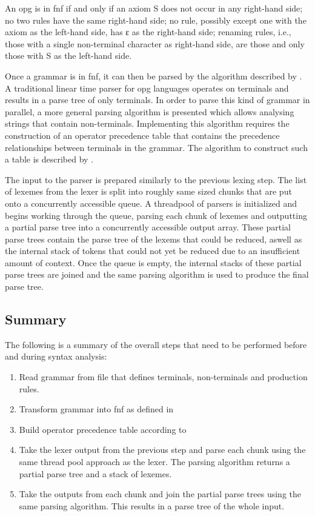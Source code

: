 An \gls{opg} is in \gls{fnf} if and only if an axiom S does not
occur in any right-hand side; no two rules have the same right-hand side;
no rule, possibly except one with the axiom as the left-hand side, has ε as
the right-hand side; renaming rules, i.e., those with a single non-terminal
character as right-hand side, are those and only those with S as the left-hand
side.

Once a grammar is in \gls{fnf}, it can then be parsed by the algorithm
described by \cite{barenghi_parallel_2015}. A traditional linear time parser
for \gls{opg} languages operates on terminals and results in a parse tree of
only terminals. In order to parse this kind of grammar in parallel, a more
general parsing algorithm is presented which allows analysing strings that
contain non-terminals. Implementing this algorithm requires the construction of
an operator precedence table that contains the precedence relationships between
terminals in the grammar. The algorithm to construct such a table is described
by \cite{grune_parsing_2008}.

The input to the parser is prepared similarly to the previous lexing step.
The list of lexemes from the lexer is split into roughly same sized chunks
that are put onto a concurrently accessible queue. A threadpool of parsers is
initialized and begins working through the queue, parsing each chunk of lexemes
and outputting a partial parse tree into a concurrently accessible output array.
These partial parse trees contain the parse tree of the lexems that could be
reduced, aswell as the internal stack of tokens that could not yet be reduced
due to an insufficient amount of context. Once the queue is empty, the internal
stacks of these partial parse trees are joined and the same parsing algorithm is
used to produce the final parse tree.

\subsection{Summary}
The following is a summary of the overall steps that need to be performed before
and during syntax analysis:

\begin{enumerate}
	\item Read grammar from file that defines terminals, non-terminals and
  		  production rules.
	\item Transform grammar into \gls{fnf} as defined in
		  \cite{barenghi_parallel_2015}
	\item Build operator precedence table according to \cite{grune_parsing_2008}
	\item Take the lexer output from the previous step and parse each chunk using
		  the same thread pool approach as the lexer. The parsing algorithm returns a
		  partial parse tree and a stack of lexemes.
	\item Take the outputs from each chunk and join the partial parse trees using
		  the same parsing algorithm. This results in a parse tree of the whole input.
\end{enumerate}

